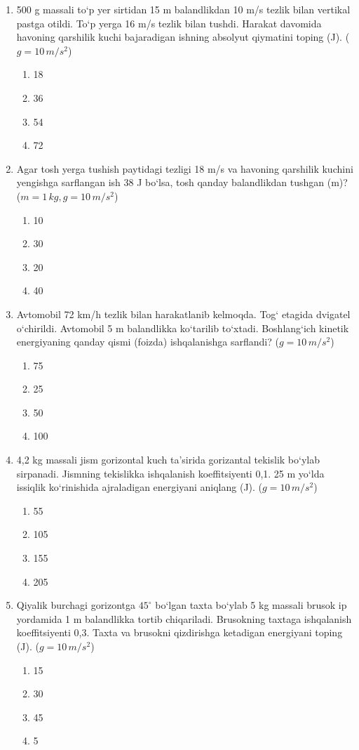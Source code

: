 \begin{enumerate}
\item 500 g massali to‘p yer sirtidan 15 m balandlikdan 10 m/s tezlik bilan vertikal pastga otildi. To‘p yerga 16 m/s tezlik bilan tushdi. Harakat davomida havoning qarshilik kuchi bajaradigan ishning absolyut qiymatini toping (J). ($g = 10 \, m/s^2$)
\begin{enumerate}[label=\Alph*)]
\item 18
\item 36
\item 54
\item 72
\end{enumerate}

\item Agar tosh yerga tushish paytidagi tezligi 18 m/s va havoning qarshilik kuchini yengishga sarflangan ish 38 J bo‘lsa, tosh qanday balandlikdan tushgan (m)? ($m = 1 \, kg, g = 10 \, m/s^2$)
\begin{enumerate}[label=\Alph*)]
\item 10
\item 30
\item 20
\item 40
\end{enumerate}

\item Avtomobil 72 km/h tezlik bilan harakatlanib kelmoqda. Tog‘ etagida dvigatel o‘chirildi. Avtomobil 5 m balandlikka ko‘tarilib to‘xtadi. Boshlang‘ich kinetik energiyaning qanday qismi (foizda) ishqalanishga sarflandi? ($g = 10 \, m/s^2$)
\begin{enumerate}[label=\Alph*)]
\item 75
\item 25
\item 50
\item 100
\end{enumerate}

\item 4,2 kg massali jism gorizontal kuch ta’sirida gorizantal tekislik bo‘ylab sirpanadi. Jismning tekislikka ishqalanish koeffitsiyenti 0,1. 25 m yo‘lda issiqlik ko‘rinishida ajraladigan energiyani aniqlang (J). ($g = 10 \, m/s^2$)
\begin{enumerate}[label=\Alph*)]
\item 55
\item 105
\item 155
\item 205
\end{enumerate}

\item Qiyalik burchagi gorizontga $45^\circ$ bo‘lgan taxta bo‘ylab 5 kg massali brusok ip yordamida 1 m balandlikka tortib chiqariladi. Brusokning taxtaga ishqalanish koeffitsiyenti 0,3. Taxta va brusokni qizdirishga ketadigan energiyani toping (J). ($g = 10 \, m/s^2$)
\begin{enumerate}[label=\Alph*)]
\item 15
\item 30
\item 45
\item 5
\end{enumerate}


\end{enumerate}
